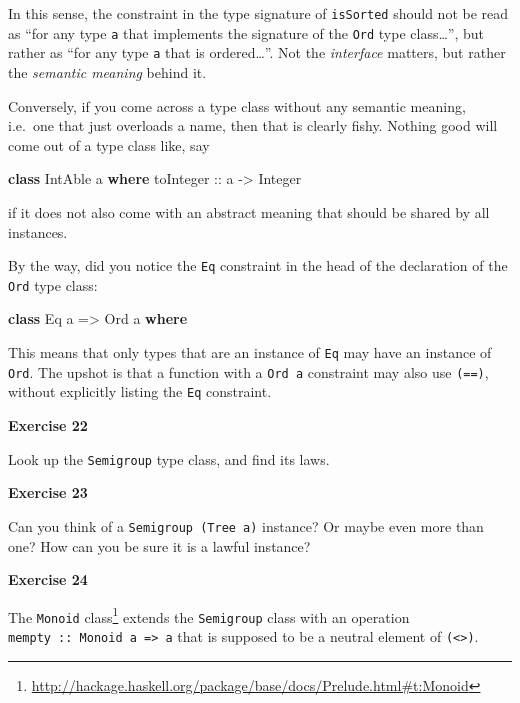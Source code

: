 \documentclass[11pt,
  american,
  DIV13]{article}
\newenvironment{Shaded}{}{}
\newcommand{\DataTypeTok}[1]{\textcolor[rgb]{0.56,0.13,0.00}{#1}}
\newcommand{\KeywordTok}[1]{\textcolor[rgb]{0.00,0.44,0.13}{\textbf{#1}}}
\newcommand{\NormalTok}[1]{#1}
\newcommand{\OtherTok}[1]{\textcolor[rgb]{0.00,0.44,0.13}{#1}}
\DeclareRobustCommand{\href}[2]{#2\footnote{\url{#1}}}
\begin{document}
In this sense, the constraint in the type signature of \texttt{isSorted}
should not be read as ``for any type \texttt{a} that implements the
signature of the \texttt{Ord} type class\ldots{}'', but rather as ``for
any type \texttt{a} that is ordered\ldots{}''. Not the \emph{interface}
matters, but rather the \emph{semantic meaning} behind it.

Conversely, if you come across a type class without any semantic
meaning, i.e.~one that just overloads a name, then that is clearly
fishy. Nothing good will come out of a type class like, say

\begin{Shaded}
\begin{Highlighting}[]
\KeywordTok{class} \DataTypeTok{IntAble}\NormalTok{ a }\KeywordTok{where}\OtherTok{ toInteger ::}\NormalTok{ a }\OtherTok{{-}\textgreater{}} \DataTypeTok{Integer}
\end{Highlighting}
\end{Shaded}

if it does not also come with an abstract meaning that should be shared
by all instances.

By the way, did you notice the \texttt{Eq} constraint in the head of the
declaration of the \texttt{Ord} type class:

\begin{Shaded}
\begin{Highlighting}[]
\KeywordTok{class} \DataTypeTok{Eq}\NormalTok{ a }\OtherTok{=\textgreater{}} \DataTypeTok{Ord}\NormalTok{ a }\KeywordTok{where}
\end{Highlighting}
\end{Shaded}

This means that only types that are an instance of \texttt{Eq} may have
an instance of \texttt{Ord}. The upshot is that a function with a
\texttt{Ord\ a} constraint may also use \texttt{(==)}, without
explicitly listing the \texttt{Eq} constraint.

\textbf{Exercise 22}

Look up the \texttt{Semigroup} type class, and find its laws.

\textbf{Exercise 23}

Can you think of a \texttt{Semigroup\ (Tree\ a)} instance? Or maybe even
more than one? How can you be sure it is a lawful instance?

\textbf{Exercise 24}

The
\href{http://hackage.haskell.org/package/base/docs/Prelude.html\#t:Monoid}{\texttt{Monoid}
class} extends the \texttt{Semigroup} class with an operation
\texttt{mempty\ ::\ Monoid\ a\ =\textgreater{}\ a} that is supposed to
be a neutral element of \texttt{(\textless{}\textgreater{})}.
\end{document}
